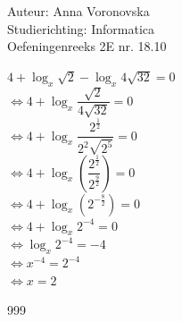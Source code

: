 \documentclass[a4paper]{article}
\begin{document}
  
\noindent \large Auteur: Anna Voronovska \\
\noindent \large Studierichting: Informatica\\
\noindent \large Oefeningenreeks 2E nr. 18.10\\

\medskip

\normalsize

$4 + \log_x \sqrt{2} - \log_x 4\sqrt{32} = 0$ \\

$\Leftrightarrow 4 + \log_x \dfrac{\sqrt{2}}{4\sqrt{32}} = 0$ \\

$\Leftrightarrow 4 + \log_x \dfrac{2^{\tfrac{1}{2}}}{2^2 \sqrt{2^5}} = 0$ \\

$\Leftrightarrow 4 + \log_x \left( \dfrac{2^{\tfrac{1}{2}}}{2^{\tfrac{9}{2}}} \right) = 0$ \\

$\Leftrightarrow 4 + \log_x (2^{-\tfrac{8}{2}}) = 0$ \\

$\Leftrightarrow 4 + \log_x 2^{-4} = 0$ \\

$\Leftrightarrow \log_x 2^{-4} = -4$ \\

$\Leftrightarrow x^{-4} = 2^{-4}$ \\

$\Leftrightarrow x = 2$



\begin{thebibliography}{999}
\end{thebibliography}
\end{document}
